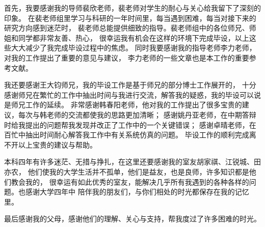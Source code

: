 
\begin{acknowledgements}
首先，我要感谢我的导师裴欣老师，裴老师对学生的耐心与关心给我留下了深刻的印象。
在裴老师组里学习与科研的一年时间里，每当遇到困难，每当对接下来的研究方向感到迷茫时，
裴老师总能提供细致的指导。裴老师组中的各位师兄、师姐和同学都非常友善、热心，
很幸运我有机会在这样的环境下完成毕设，以上这些大大减少了我完成毕设过程中的焦虑。
同时我要感谢我的指导老师李力老师，对我的工作提出了重要的意见与建议，
李力老师的一些文章也是本工作的重要参考文献。

我还要感谢王大钧师兄，我的毕设工作是基于师兄的部分博士工作展开的，
十分感谢师兄在繁忙的工作中抽出时间与我进行交流，解答我的疑惑，我的毕设可以说是师兄工作的延续。
非常感谢韩春阳老师，他对我的工作提出了很多宝贵的建议，每次与韩老师的交流都使我的思路更加清晰；
感谢姚丹亚老师，在中期答辩时给我提出的问题帮我发现并改正了工作中的一个关键错误；
感谢卓晴老师，在百忙中抽出时间耐心解答我工作中有关系统仿真的问题。
毕设工作的顺利完成离不开以上宝贵的建议与帮助。

本科四年有许多迷茫、无措与挣扎，在这里还要感谢我的室友胡家祺、江锐城、田亦农，
他们使我的大学生活并不孤单，他们是益友，也是良师，许多知识都是他们教会我的，
很幸运有如此优秀的室友，能解决几乎所有我遇到的各种各样的问题。也感谢大学四年中
陪伴我的朋友们，与你们相处的时光都保存在我的记忆里。

最后感谢我的父母，感谢他们的理解、关心与支持，帮我度过了许多困难的时光。
\end{acknowledgements}
